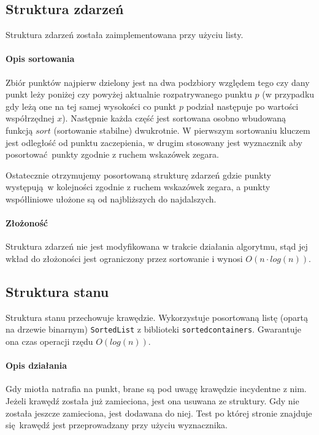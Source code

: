 \documentclass[12pt]{article}
\begin{document}
		\subsection{Struktura zdarzeń}
			Struktura zdarzeń została zaimplementowana przy użyciu listy. 
			
			\paragraph{Opis sortowania}
				Zbiór punktów najpierw dzielony jest na dwa podzbiory względem tego czy dany punkt leży poniżej czy powyżej aktualnie rozpatrywanego punktu $ p $ (w przypadku gdy leżą one na tej samej wysokości co punkt $ p $ podział następuje po wartości współrzędnej $ x $). Następnie każda część jest sortowana osobno wbudowaną funkcją $ sort $ (sortowanie stabilne) dwukrotnie. W pierwszym sortowaniu kluczem jest odległość od punktu zaczepienia, w drugim stosowany jest wyznacznik aby posortować punkty zgodnie z ruchem wskazówek zegara.
			
			\vspace{\baselineskip} %
			Ostatecznie otrzymujemy posortowaną strukturę zdarzeń gdzie punkty występują w kolejności zgodnie z ruchem wskazówek zegara, a punkty współliniowe ułożone są od najbliższych do najdalszych.
			
			\paragraph{Złożoność}
				Struktura zdarzeń nie jest modyfikowana w trakcie działania algorytmu, stąd jej wkład do złożoności jest ograniczony przez sortowanie i wynosi $ O(n \cdot log(n)) $.
		
		\subsection{Struktura stanu}
			Struktura stanu przechowuje krawędzie. Wykorzystuje posortowaną listę (opartą na drzewie binarnym) \lstinline|SortedList| z biblioteki \lstinline|sortedcontainers|. Gwarantuje ona czas operacji rzędu $ O(log(n)) $.
			
			\paragraph{Opis działania}
				Gdy miotła natrafia na punkt, brane są pod uwagę krawędzie incydentne z nim. Jeżeli krawędź została już zamieciona, jest ona usuwana ze struktury. Gdy nie została jeszcze zamieciona, jest dodawana do niej. Test po której stronie znajduje się krawędź jest przeprowadzany przy użyciu wyznacznika.
				
\end{document}
